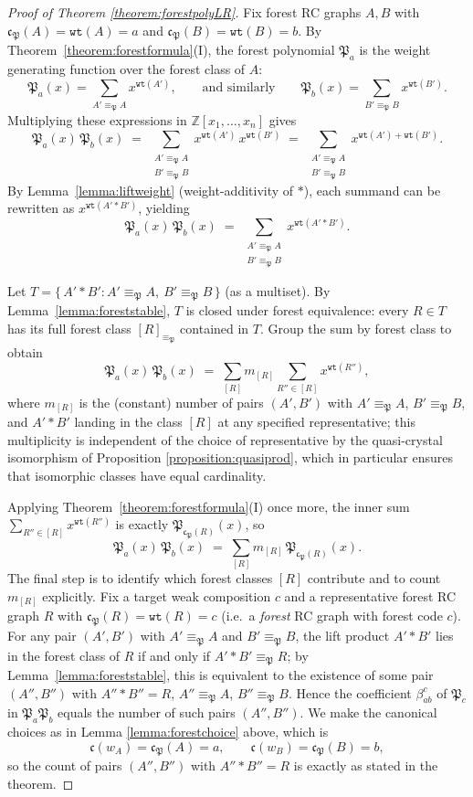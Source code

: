 \documentclass[a4paper,fleqn]{cas-sc}
\theoremstyle{definition}
\theoremstyle{remark}
\numberwithin{equation}{subsection}
\newcommand{\wof}[1]{w_{#1}}
\newcommand{\wtt}{\mathtt{wt}}
\newcommand{\code}{\mathfrak{c}}
\newcommand{\forest}{\mathfrak{P}}
\newcommand{\fcode}{\mathfrak{c}_\forest}
\begin{document}
\begin{proof}[Proof of Theorem \ref{theorem:forestpolyLR}]
Fix forest RC graphs $A, B$ with $\code_\forest(A)=\wtt(A)=a$ and $\code_\forest(B)=\wtt(B)=b$. By Theorem~\ref{theorem:forestformula}(I), the forest polynomial $\forest_a$ is the weight generating function over the forest class of $A$:
$$\forest_a(x) = \sum_{A'\equiv_\forest A} x^{\wtt(A')},\qquad\text{and similarly}\qquad \forest_b(x) = \sum_{B'\equiv_\forest B} x^{\wtt(B')}.$$
Multiplying these expressions in $\mathbb{Z}[x_1,\ldots,x_n]$ gives
$$\forest_a(x)\,\forest_b(x) \;=\; \sum_{\substack{A'\equiv_\forest A\\ B'\equiv_\forest B}} x^{\wtt(A')}\,x^{\wtt(B')}\;=\;\sum_{\substack{A'\equiv_\forest A\\ B'\equiv_\forest B}} x^{\wtt(A')+\wtt(B')}.$$
By Lemma~\ref{lemma:liftweight} (weight-additivity of $*$), each summand can be rewritten as $x^{\wtt(A'*B')}$, yielding
$$\forest_a(x)\,\forest_b(x) \;=\; \sum_{\substack{A'\equiv_\forest A\\ B'\equiv_\forest B}} x^{\wtt(A'*B')}.$$

Let $T = \{\,A'*B' : A'\equiv_\forest A,\ B'\equiv_\forest B\,\}$ (as a multiset). By Lemma~\ref{lemma:foreststable}, $T$ is closed under forest equivalence: every $R\in T$ has its full forest class $[R]_{\equiv_\forest}$ contained in $T$. Group the sum by forest class to obtain
$$\forest_a(x)\,\forest_b(x) \;=\; \sum_{[R]} m_{[R]}\sum_{R''\in[R]} x^{\wtt(R'')},$$
where $m_{[R]}$ is the (constant) number of pairs $(A',B')$ with $A'\equiv_\forest A$, $B'\equiv_\forest B$, and $A'*B'$ landing in the class $[R]$ at any specified representative; this multiplicity is independent of the choice of representative by the quasi-crystal isomorphism of Proposition \ref{proposition:quasiprod}, which in particular ensures that isomorphic classes have equal cardinality.

Applying Theorem~\ref{theorem:forestformula}(I) once more, the inner sum $\sum_{R''\in[R]}x^{\wtt(R'')}$ is exactly $\forest_{\fcode(R)}(x)$, so
$$\forest_a(x)\,\forest_b(x) \;=\; \sum_{[R]} m_{[R]}\,\forest_{\fcode(R)}(x).$$
The final step is to identify which forest classes $[R]$ contribute and to count $m_{[R]}$ explicitly. Fix a target weak composition $c$ and a representative forest RC graph $R$ with $\code_\forest(R)=\wtt(R)=c$ (i.e.\ a \emph{forest} RC graph with forest code $c$). For any pair $(A',B')$ with $A'\equiv_\forest A$ and $B'\equiv_\forest B$, the lift product $A'*B'$ lies in the forest class of $R$ if and only if $A'*B'\equiv_\forest R$; by Lemma~\ref{lemma:foreststable}, this is equivalent to the existence of some pair $(A'',B'')$ with $A''*B''=R$, $A''\equiv_\forest A$, $B''\equiv_\forest B$. Hence the coefficient $\beta_{ab}^c$ of $\forest_c$ in $\forest_a\forest_b$ equals the number of such pairs $(A'',B'')$. We make the canonical choices as in Lemma \ref{lemma:forestchoice} above, which is 
$$\code(\wof{A})=\code_\forest(A)=a,\qquad \code(\wof{B})=\code_\forest(B)=b,$$
so the count of pairs $(A'',B'')$ with $A''*B''=R$ is exactly as stated in the theorem.
\end{proof}
\end{document}
